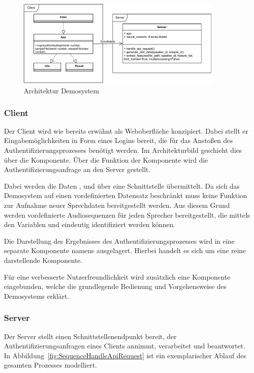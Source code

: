 \begin{figure}[H]
    \centering
    \includegraphics[width=0.9\textwidth, keepaspectratio]{images/Architektur-Demosystem}
    \caption{Architektur Demosystem}
    \label{fig:ArchitectureDemoSystem}
\end{figure}

\subsubsection{Client}
Der Client wird wie bereits erwähnt als Weboberfläche konzipiert.
Dabei stellt er Eingabemöglichkeiten in Form eines Logins bereit, die für das Anstoßen des Authentifizierungsprozesses benötigt werden.
Im Architekturbild geschieht dies über die  Komponente.
Über die  Funktion der Komponente wird die Authentifizierungsanfrage an den Server gestellt.

Dabei werden die Daten ,  und  über eine Schnittstelle übermittelt.
Da sich das Demosystem auf einen vordefinierten Datensatz beschränkt muss keine Funktion zur Aufnahme neuer Sprechdaten bereitgestellt werden.
Aus diesem Grund werden vordefinierte Audiosequenzen für jeden Sprecher bereitgestellt, die mittels den Variablen  und  eindeutig identifiziert werden können.

Die Darstellung des Ergebnisses des Authentifizierungsprozesses wird in eine separate Komponente namens  ausgelagert.
Hierbei handelt es sich um eine reine darstellende Komponente.

Für eine verbesserte Nutzerfreundlichkeit wird zusätzlich eine  Komponente eingebunden, welche die grundlegende Bedienung und Vorgehensweise des Demosystems erklärt.

\subsubsection{Server}
Der Server stellt einen Schnittstellenendpunkt bereit, der Authentifizierungsanfragen eines Clients annimmt, verarbeitet und beantwortet.
In Abbildung~\ref{fig:SequenceHandleApiRequest} ist ein exemplarischer Ablauf des gesamten Prozesses modelliert.

